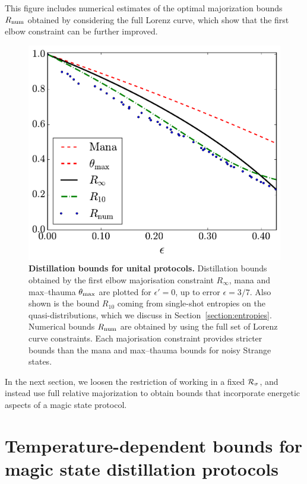 \documentclass[pra,
aps,
twocolumn,
superscriptaddress,
groupedaddress,
nofootinbib,
reprint
]{revtex4-1}
\begin{document}
This figure includes numerical estimates of the optimal majorization bounds $R_{\rm{num}}$ obtained by considering the full Lorenz curve, which show that the first elbow constraint can be further improved.
\begin{figure}[t]
    \centering
    \includegraphics[scale=0.35]{figs/distill_bounds.pdf}
    \caption{\textbf{Distillation bounds for unital protocols.} Distillation bounds obtained by the first elbow majorisation constraint $R_\infty$, mana and max--thauma $\theta_{\rm{max}}$ are plotted for $\epsilon' = 0$, up to error $\epsilon = 3/7$. Also shown is the bound $R_{10}$ coming from single-shot entropies on the quasi-distributions, which we discuss in Section~\ref{section:entropies}. Numerical bounds $R_{\rm{num}}$ are obtained by using the full set of Lorenz curve constraints. Each majorisation constraint provides stricter bounds than the mana and max--thauma bounds for noisy Strange states.
    }
    \label{fig:distill_bounds}
\end{figure}

In the next section, we loosen the restriction of working in a fixed ${\mathcal R}_\sigma$, and instead use full relative majorization to obtain bounds that incorporate energetic aspects of a magic state protocol.

\section{Temperature-dependent bounds for magic state distillation protocols}
\label{sec:stab}
\end{document}
